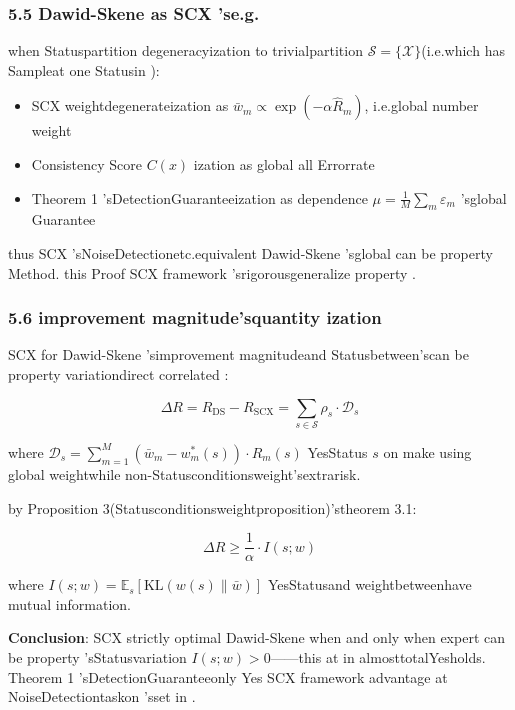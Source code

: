 \documentclass[
  12pt,
]{article}
\providecommand{\tightlist}{%
  \setlength{\itemsep}{0pt}\setlength{\parskip}{0pt}}
\begin{document}
\subsubsection{5.5 Dawid-Skene as  SCX
'se.g.}\label{dawid-skene-ux4f5cux4e3a-scx-ux7684ux7279ux4f8b}

when Statuspartition degeneracyization to trivialpartition
\(\mathcal{S} = \{\mathcal{X}\}\)(i.e.which has Sampleat one Statusin ): 

\begin{itemize}
\tightlist
\item
  SCX weightdegenerateization as 
  \(\bar{w}_m \propto \exp(-\alpha \hat{R}_m)\), i.e.global number weight
\item
  Consistency Score \(C(x)\) ization as global all Errorrate 
\item
  Theorem 1 'sDetectionGuaranteeization as dependence
  \(\mu = \frac{1}{M}\sum_m \varepsilon_m\) 'sglobal Guarantee
\end{itemize}

thus SCX 'sNoiseDetectionetc.equivalent Dawid-Skene 'sglobal can be property Method. this Proof SCX
framework 'srigorousgeneralize property . 

\subsubsection{5.6
improvement magnitude'squantity ization }\label{ux6539ux8fdbux5e45ux5ea6ux7684ux91cfux5316}

SCX for  Dawid-Skene 'simprovement magnitudeand Statusbetween'scan be property variationdirect correlated : 

\[\Delta R = R_{\text{DS}} - R_{\text{SCX}} = \sum_{s \in \mathcal{S}} \rho_s \cdot \mathcal{D}_s\]

where
\(\mathcal{D}_s = \sum_{m=1}^M (\bar{w}_m - w_m^*(s)) \cdot R_m(s)\)
YesStatus \(s\) on make using global weightwhile non-Statusconditionsweight'sextrarisk. 

by  Proposition 3(Statusconditionsweightproposition)'stheorem  3.1: 

\[\Delta R \geq \frac{1}{\alpha} \cdot I(s; w)\]

where \(I(s; w) = \mathbb{E}_s[\text{KL}(w(s) \| \bar{w})]\)
YesStatusand weightbetweenhave mutual information. 

\textbf{Conclusion}: SCX strictly optimal Dawid-Skene when and only when expert can be property 'sStatusvariation
\(I(s; w) > 0\)------this at in almosttotalYesholds. Theorem 1 'sDetectionGuaranteeonly Yes
SCX framework advantage at NoiseDetectiontaskon 'sset in . 
\end{document}
